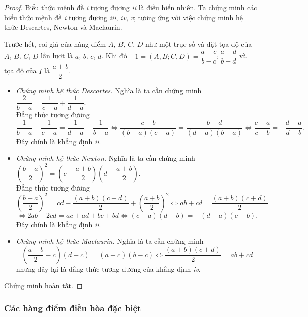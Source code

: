 \documentclass{article} %
\begin{document}
        \begin{proof}
            Biểu thức mệnh đề \textit{i} tương đương \textit{ii} là điều hiển nhiên. Ta chứng minh các biểu thức mệnh đề \textit{i} tương đương \textit{iii}, \textit{iv}, \textit{v}; tương ứng với việc chứng minh hệ thức Descartes, Newton và Maclaurin.

            Trước hết, coi giá của hàng điểm \(A\), \(B\), \(C\), \(D\) như một trục số và đặt tọa độ của \(A\), \(B\), \(C\), \(D\) lần lượt là \(a\), \(b\), \(c\), \(d\). Khi đó \(-1 = (A,B;C,D) = \dfrac{a - c}{b - c} : \dfrac{a - d}{b - d}\) và tọa độ của \(I\) là \(\dfrac{a + b}{2}\).

            \begin{itemize}
                \item \textit{Chứng minh hệ thức Descartes.} Nghĩa là ta cần chứng minh \(\dfrac{2}{b - a} = \dfrac{1}{c - a} + \dfrac{1}{d - a}\). \\ Đẳng thức tương đương
                \[\frac{1}{b - a} - \frac{1}{c - a} = \frac{1}{d - a} - \frac{1}{b - a} \Leftrightarrow \frac{c - b}{(b - a)(c - a)} = \frac{b - d}{(d - a)(b - a)} \Leftrightarrow \frac{c - a}{c - b} = -\frac{d - a}{d - b}.\]
                Đây chính là khẳng định \textit{ii}.

                \item \textit{Chứng minh hệ thức Newton.} Nghĩa là ta cần chứng minh \(\left(\dfrac{b - a}{2}\right)^2 = \left(c - \dfrac{a + b}{2}\right)\left(d - \dfrac{a + b}{2}\right)\). \\ Đẳng thức tương đương
                \[\left(\frac{b - a}{2}\right)^2 = cd - \frac{(a + b)(c + d)}{2} + \left(\frac{a + b}{2}\right)^2 \Leftrightarrow ab + cd = \frac{(a + b)(c + d)}{2}\]
                \[\Leftrightarrow 2ab + 2cd = ac + ad + bc + bd \Leftrightarrow (c - a)(d - b) = -(d - a)(c - b).\]
                Đây chính là khẳng định \textit{ii}.

                \item \textit{Chứng minh hệ thức Maclaurin.} Nghĩa là ta cần chứng minh 
                \[\left(\frac{a + b}{2} - c\right)(d - c) = (a - c)(b - c) \Leftrightarrow \frac{(a + b)(c + d)}{2} = ab + cd\]
                nhưng đây lại là đẳng thức tương đương của khẳng định \textit{iv}.
            \end{itemize}
            Chứng minh hoàn tất.
        \end{proof}

    \subsubsection*{Các hàng điểm điều hòa đặc biệt}
\end{document}
